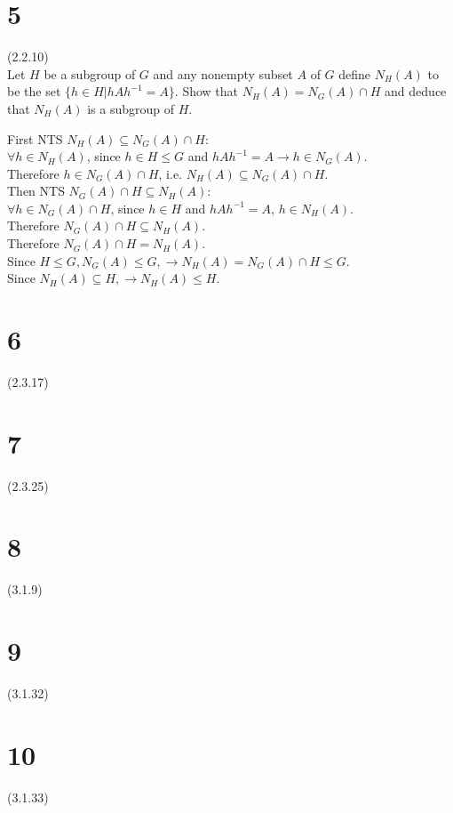 \documentclass{article}
\begin{document}
\section*{5}
(2.2.10)\\
Let $H$ be a subgroup of $G$ and any nonempty subset $A$ of $G$ define $N_H(A)$ to be the set $\{h \in H | hAh^{-1} = A\}$. Show that $N_H(A) = N_G(A) \cap H$ and deduce that $N_H(A)$ is a subgroup of $H$.
\begin{addmargin}[1em]{0em}
    First NTS $N_H(A) \subseteq N_G(A) \cap H$:\\
    $\forall h \in N_H(A)$, since $h \in H \leq G$ and $hAh^{-1} = A \rightarrow h \in N_G(A)$.\\
    Therefore $h \in N_G(A) \cap H$, i.e. $N_H(A) \subseteq N_G(A) \cap H$.\\
    Then NTS $N_G(A) \cap H \subseteq N_H(A)$:\\
    $\forall h \in N_G(A) \cap H$, since $h \in H$ and $hAh^{-1} = A$, $h \in N_H(A)$.\\
    Therefore $N_G(A) \cap H \subseteq N_H(A)$.\\
    Therefore $N_G(A) \cap H = N_H(A)$.\\
    Since $H \leq G, N_G(A) \leq G, \rightarrow N_H(A)=N_G(A) \cap H \leq G$.\\
    Since $N_H(A) \subseteq H, \rightarrow N_H(A) \leq H$.
\end{addmargin}
\section*{6}
(2.3.17)
\section*{7}
(2.3.25)
\section*{8}
(3.1.9)
\section*{9}
(3.1.32)
\section*{10}
(3.1.33)
\end{document}
